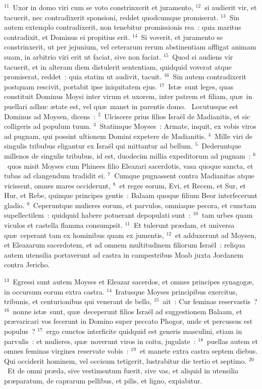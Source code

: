 ${}^{11}$~Uxor in domo viri cum se voto constrinxerit et juramento,
${}^{12}$~si audierit vir, et tacuerit, nec contradixerit sponsioni, reddet quodcumque promiserat.
${}^{13}$~Sin autem extemplo contradixerit, non tenebitur promissionis rea~: quia maritus contradixit, et Dominus ei propitius erit.
${}^{14}$~Si voverit, et juramento se constrinxerit, ut per jejunium, vel ceterarum rerum abstinentiam affligat animam suam, in arbitrio viri erit ut faciat, sive non faciat.
${}^{15}$~Quod si audiens vir tacuerit, et in alteram diem distulerit sententiam, quidquid voverat atque promiserat, reddet~: quia statim ut audivit, tacuit.
${}^{16}$~Sin autem contradixerit postquam rescivit, portabit ipse iniquitatem ejus.
${}^{17}$~Ist\ae\ sunt leges, quas constituit Dominus Moysi inter virum et uxorem, inter patrem et filiam, qu\ae\ in puellari adhuc \ae tate est, vel qu\ae\ manet in parentis domo.
~Locutusque est Dominus ad Moysen, dicens~:
${}^{2}$~Ulciscere prius filios Isra\"el de Madianitis, et sic colligeris ad populum tuum.
${}^{3}$~Statimque Moyses~: Armate, inquit, ex vobis viros ad pugnam, qui possint ultionem Domini expetere de Madianitis.
${}^{4}$~Mille viri de singulis tribubus eligantur ex Isra\"el qui mittantur ad bellum.
${}^{5}$~Dederuntque millenos de singulis tribubus, id est, duodecim millia expeditorum ad pugnam~:
${}^{6}$~quos misit Moyses cum Phinees filio Eleazari sacerdotis, vasa quoque sancta, et tubas ad clangendum tradidit ei.
${}^{7}$~Cumque pugnassent contra Madianitas atque vicissent, omnes mares occiderunt,
${}^{8}$~et reges eorum, Evi, et Recem, et Sur, et Hur, et Rebe, quinque principes gentis~: Balaam quoque filium Beor interfecerunt gladio.
${}^{9}$~Ceperuntque mulieres eorum, et parvulos, omniaque pecora, et cunctam supellectilem~: quidquid habere potuerant depopulati sunt~:
${}^{10}$~tam urbes quam viculos et castella flamma consumpsit.
${}^{11}$~Et tulerunt pr\ae dam, et universa qu\ae\ ceperant tam ex hominibus quam ex jumentis,
${}^{12}$~et adduxerunt ad Moysen, et Eleazarum sacerdotem, et ad omnem multitudinem filiorum Isra\"el~: reliqua autem utensilia portaverunt ad castra in campestribus Moab juxta Jordanem contra Jericho.


${}^{13}$~Egressi sunt autem Moyses et Eleazar sacerdos, et omnes principes synagog\ae , in occursum eorum extra castra.
${}^{14}$~Iratusque Moyses principibus exercitus, tribunis, et centurionibus qui venerant de bello,
${}^{15}$~ait~: Cur feminas reservastis~?
${}^{16}$~nonne ist\ae\ sunt, qu\ae\ deceperunt filios Isra\"el ad suggestionem Balaam, et pr\ae varicari vos fecerunt in Domino super peccato Phogor, unde et percussus est populus~?
${}^{17}$~ergo cunctos interficite quidquid est generis masculini, etiam in parvulis~: et mulieres, qu\ae\ noverunt viros in coitu, jugulate~:
${}^{18}$~puellas autem et omnes feminas virgines reservate vobis~:
${}^{19}$~et manete extra castra septem diebus. Qui occiderit hominem, vel occisum tetigerit, lustrabitur die tertio et septimo.
${}^{20}$~Et de omni pr\ae da, sive vestimentum fuerit, sive vas, et aliquid in utensilia pr\ae paratum, de caprarum pellibus, et pilis, et ligno, expiabitur.


